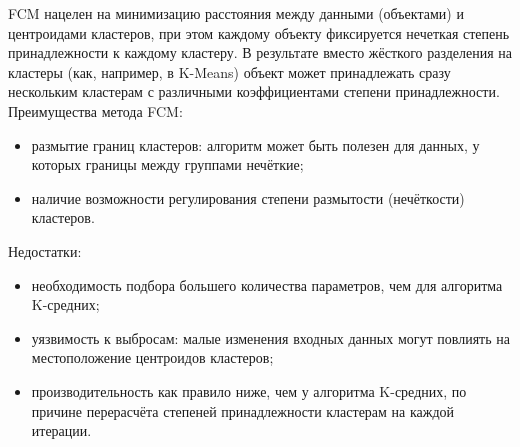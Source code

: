 FCM нацелен на минимизацию расстояния между данными (объектами) и центроидами кластеров, при этом каждому объекту фиксируется нечеткая степень принадлежности к каждому кластеру. В результате вместо жёсткого разделения на кластеры (как, например, в K-Means) объект может принадлежать сразу нескольким кластерам с различными коэффициентами степени принадлежности.
Преимущества метода FCM:
\begin{itemize}[label*=---]
	\item размытие границ кластеров: алгоритм может быть полезен для данных, у которых границы между группами нечёткие;
	\item наличие возможности регулирования степени размытости (нечёткости) кластеров.
\end{itemize}
Недостатки:
\begin{itemize}[label*=---]
	\item необходимость подбора большего количества параметров, чем для алгоритма K-средних;
	\item уязвимость к выбросам: малые изменения входных данных могут повлиять на местоположение центроидов кластеров;
	\item производительность как правило ниже, чем у алгоритма K-средних, по причине перерасчёта степеней принадлежности кластерам на каждой итерации.
\end{itemize}


\clearpage
